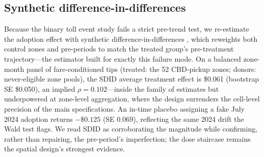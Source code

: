 \subsection{Synthetic difference-in-differences}
Because the binary toll event study fails a strict pre-trend test, we
re-estimate the adoption effect with synthetic difference-in-differences
\parencite{arkhangelsky2021synthetic}, which reweights both control
zones and pre-periods to match the treated group's pre-treatment
trajectory---the estimator built for exactly this failure mode. On a
balanced zone-month panel of fare-conditioned tips (treated: the 52
CBD-pickup zones; donors: never-eligible zone pools), the SDID average
treatment effect is \$0.061 (bootstrap SE \$0.050), an implied
$\rho = 0.102$---inside the family of estimates but underpowered at
zone-level aggregation, where the design surrenders the cell-level
precision of the main specifications. An in-time placebo assigning a
fake July 2024 adoption returns $-\$0.125$ (SE $0.069$), reflecting the
same 2024 drift the Wald test flags. We read SDID as corroborating the
magnitude while confirming, rather than repairing, the pre-period's
imperfection; the dose staircase remains the spatial design's strongest
evidence.
